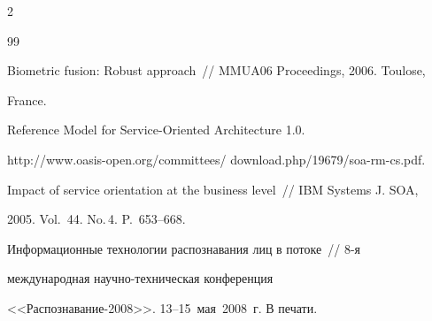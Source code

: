 \begin{multicols}{2}
{{\begin{thebibliography}{99}


Biometric fusion: Robust approach~// MMUA06 Proceedings, 2006. Toulose, 

France.






Reference Model for Service-Oriented Architecture 1.0.

{\sf http://www.oasis-open.org/committees/ \mbox{download.php/19679/soa-rm-cs.pdf}}.





 Impact of service orientation at the business level~// IBM Systems J. SOA, 

2005. Vol.~44. No.\,4. P.~653--668.



\label{end\stat}





Информационные технологии распознавания лиц в потоке~// 8-я 

международная научно-техническая конференция 

<<Распознавание-2008>>. 13--15~мая~2008~г. В печати.



\end{thebibliography}



}

}

\end{multicols}









%



%


